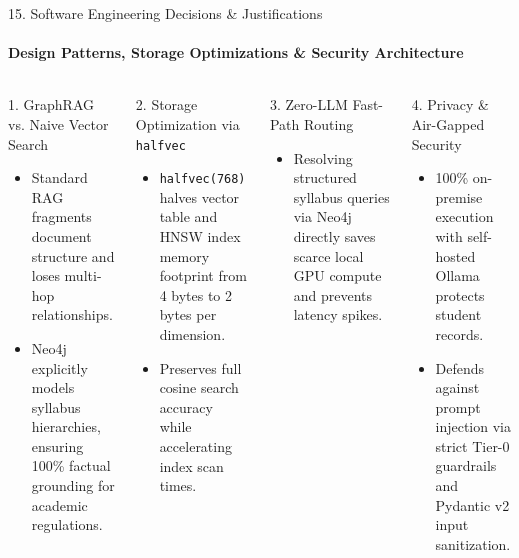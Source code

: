 \documentclass[aspectratio=169, 11pt]{beamer}
\begin{document}
\begin{frame}{15. Software Engineering Decisions \& Justifications}
    \framesubtitle{Design Patterns, Storage Optimizations \& Security Architecture}
    \begin{columns}[T]
        \begin{block}{1. GraphRAG vs. Naive Vector Search}
            \footnotesize
            \begin{itemize}
                \item Standard RAG fragments document structure and loses multi-hop relationships.
                \item Neo4j explicitly models syllabus hierarchies, ensuring 100\% factual grounding for academic regulations.
            \end{itemize}
        \end{block}

        \begin{block}{2. Storage Optimization via \texttt{halfvec}}
            \footnotesize
            \begin{itemize}
                \item \texttt{halfvec(768)} halves vector table and HNSW index memory footprint from 4 bytes to 2 bytes per dimension.
                \item Preserves full cosine search accuracy while accelerating index scan times.
            \end{itemize}
        \end{block}

        \begin{block}{3. Zero-LLM Fast-Path Routing}
            \footnotesize
            \begin{itemize}
                \item Resolving structured syllabus queries via Neo4j directly saves scarce local GPU compute and prevents latency spikes.
            \end{itemize}
        \end{block}

        \begin{block}{4. Privacy \& Air-Gapped Security}
            \footnotesize
            \begin{itemize}
                \item 100\% on-premise execution with self-hosted Ollama protects student records.
                \item Defends against prompt injection via strict Tier-0 guardrails and Pydantic v2 input sanitization.
            \end{itemize}
        \end{block}
    \end{columns}
\end{frame}
\end{document}
